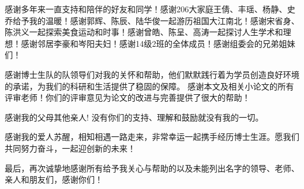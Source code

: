 \begin{ack}
感谢多年来一直支持和陪伴的好友和同学！感谢206大家庭王倩、丰瑶、杨静、史乔给予我的温暖！感谢郭辉、陈辰、陆华俊一起游历祖国大江南北！感谢宋省身、陈洪义一起探索美食运动和时事！感谢曾皓、陈呈、高涛一起探讨人生学术和理想！感谢邻居李豪和岑阳夫妇！感谢14级2班的全体成员！感谢组委会的兄弟姐妹们！

感谢博士生队的队领导们对我的关怀和帮助，他们默默践行着为学员创造良好环境的承诺，为我们的科研和生活提供了稳固的保障。
感谢本文及相关小论文的所有评审老师！你们的评审意见为论文的改进与完善提供了很大的帮助！

感谢我的父母其他亲人! 没有你们的支持、理解和鼓励就没有我的一切。

感谢我的爱人苏醒，相知相遇一路走来，非常幸运一起携手经历博士生涯。愿我们
共同努力奋斗，一起迎创新的未来！

最后，再次诚挚地感谢所有给予我关心与帮助的以及未能列出名字的领导、老师、亲人和朋友们，感谢你们！



\end{ack}
